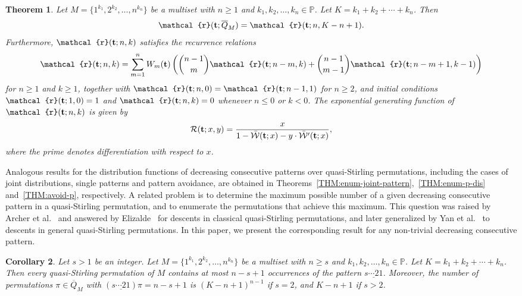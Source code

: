 \documentclass[11pt]{article}
\newcommand{\vt} { {\bf t}}
\numberwithin{equation}{section}
\newtheorem{thm}{Theorem}[section]
\newtheorem{cor}[thm]{Corollary}
\def\cR{\mathcal{R}}
\def\cW{\mathcal{W}}
\def\oQ{\overline{Q}}
\newcommand{\ccr}{\mathcal{r}}
\begin{document}
\begin{thm}\label{THM:dis-run}
	Let $M=\{1^{k_1},2^{k_2},\ldots,n^{k_n}\}$ be a multiset with $n\geq 1$ and $k_1,k_2,\ldots,k_n\in\mathbb P$. Let 
	$K=k_1+k_2+\cdots +k_n$. Then
	\[
	\ccr(\vt;\oQ_M)=\ccr(\vt;n,K-n+1).
	\]
	Furthermore, $\ccr(\vt;n,k)$ satisfies the recurrence relations
	\begin{align*}
	\ccr(\vt;n,k)=%
	\sum_{m=1}^{n}W_m(\vt)\left(\binom{n-1}{m}\ccr(\vt;n-m,k)+\binom{n-1}{m-1}\ccr(\vt;n-m+1,k-1)\right)
	\end{align*}
	for $n\geq1$ and $k\geq1$, together with $\ccr(\vt;n,0)=\ccr(\vt;n-1,1)$ for $n\geq2$,
	and initial conditions $\ccr(\vt;1,0)=1$ and $\ccr(\vt;n,k)=0$ whenever $n\leq0$ or $k<0$.
	The exponential generating function of $\ccr(\vt;n,k)$ is given by
	\begin{align*}
	\cR(\vt;x,y)=\frac{x}{1-\bar{\cW}(\vt;x)-y\cdot \bar{\cW}'(\vt;x)},
	\end{align*}
	where the prime denotes differentiation with respect to $x$.
\end{thm}

Analogous results for the distribution functions of decreasing consecutive patterns over quasi-Stirling permutations, including the cases of joint distributions, single patterns and pattern avoidance, are obtained in Theorems~\ref{THM:enum-joint-pattern},~\ref{THM:enum-p-dis} and~\ref{THM:avoid-p}, respectively. A related problem is to determine the maximum possible number of a given decreasing consecutive pattern in a quasi-Stirling permutation, and to enumerate the permutations that achieve this maximum. This question was raised by Archer et al.~\cite{Archer2019-1} and answered by Elizalde~\cite{Elizalde2021} for descents in classical quasi-Stirling permutations, and later generalized by Yan et al.~\cite{YanYangHuangZhu2022} to descents in general quasi-Stirling permutations. In this paper, we present the corresponding result for any non-trivial decreasing consecutive pattern.

\begin{cor}\label{COR:most-p}
	Let $s>1$ be an integer. Let $M=\{1^{k_1},2^{k_2},\ldots,n^{k_n}\}$ be a multiset with $n\geq s$ and $k_1,k_2,\ldots,k_n\in\mathbb P$. Let 
	$K=k_1+k_2+\cdots +k_n$. Then every quasi-Stirling permutation of $M$ contains at most $n-s+1$ occurrences of the pattern $\underline{s\cdots21}$. Moreover, the number of permutations $\pi\in\oQ_M$ with $(\underline{s\cdots21})\pi=n-s+1$ is $(K-n+1)^{n-1}$ if $s=2$, and $K-n+1$ if $s>2$.
\end{cor}
\end{document}

